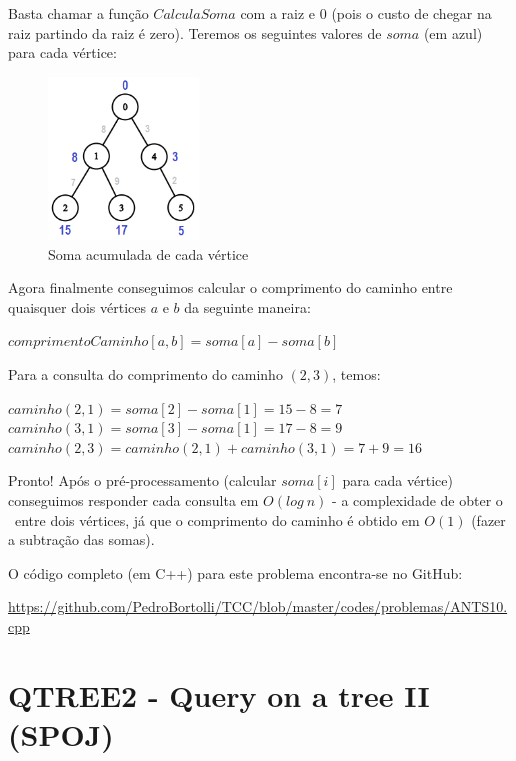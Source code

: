 Basta chamar a função $CalculaSoma$ com a raiz e $0$ (pois o custo de chegar na raiz partindo da raiz é zero). Teremos os seguintes valores de $soma$ (em azul) para cada vértice:

\begin{figure}[htb]
\begin{center}
\includegraphics[width=4cm]{images/ants10-graph2.png}
\end{center}
\caption{\label{fig:arvore-euler2}Soma acumulada de cada vértice}
\end{figure}

Agora finalmente conseguimos calcular o comprimento do caminho entre quaisquer dois vértices $a$ e $b$ da seguinte maneira:

\begin{center}
$comprimentoCaminho[a, b] = soma[a] - soma[b]$
\end{center}

Para a consulta do comprimento do caminho $(2, 3)$, temos:
\begin{center}
$caminho(2, 1) = soma[2] - soma[1] = 15 - 8 = 7$\\
$caminho(3, 1) = soma[3] - soma[1] = 17 - 8 = 9$\\
$caminho(2, 3) = caminho (2, 1) + caminho(3, 1) = 7 + 9 = 16$
\end{center}

Pronto! Após o pré-processamento (calcular $soma[i]$ para cada vértice) conseguimos responder cada consulta em $O(log\ n)$ - a complexidade de obter o \LCA\ entre dois vértices, já que o comprimento do caminho é obtido em $O(1)$ (fazer a subtração das somas).

\vspace{0.5cm}

O código completo (em C++) para este problema encontra-se no GitHub:

\url{https://github.com/PedroBortolli/TCC/blob/master/codes/problemas/ANTS10.cpp}

\vspace{10cm}

\section{QTREE2 - Query on a tree II  (SPOJ)}

